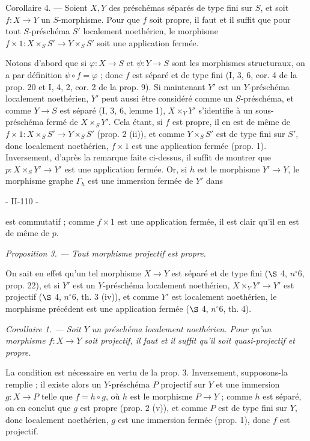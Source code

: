 Corollaire 4. — Soient $X, Y$ des préschémas séparés de type fini sur $S$, et soit $f: X \to Y$ un $S$-morphisme. Pour que $f$ soit propre, il faut et il suffit que pour tout $S$-préschéma $S'$ localement noethérien, le morphisme $f \times 1 : X \times_S S' \to Y \times_S S'$ soit une application fermée.

Notons d'abord que si $\varphi: X \to S$ et $\psi: Y \to S$ sont les morphismes structuraux, on a par définition $\psi \circ f = \varphi$ ; donc $f$ est séparé et de type fini (I, 3, 6, cor. 4 de la prop. 20 et I, 4, 2, cor. 2 de la prop. 9). Si maintenant $Y'$ est un $Y$-préschéma localement noethérien, $Y'$ peut aussi être considéré comme un $S$-préschéma, et comme $Y \to S$ est séparé (I, 3, 6, lemme 1), $X \times_Y Y'$ s'identifie à un sous-préschéma fermé de $X \times_S Y'$. Cela étant, si $f$ est propre, il en est de même de $f \times 1 : X \times_S S' \to Y \times_S S'$ (prop. 2 (ii)), et comme $Y \times_S S'$ est de type fini sur $S'$, donc localement noethérien, $f \times 1$ est une application fermée (prop. 1). Inversement, d'après la remarque faite ci-dessus, il suffit de montrer que $p: X \times_S Y' \to Y'$ est une application fermée. Or, si $h$ est le morphisme $Y' \to Y$, le morphisme graphe $\Gamma_h$ est une immersion fermée de $Y'$ dans

\newpage


- II-110 -

est commutatif ; comme $f \times 1$ est une application fermée, il est clair qu'il en est de même de $p$.

\emph{Proposition 3. — Tout morphisme projectif est propre.}

On sait en effet qu'un tel morphisme $X \to Y$ est séparé et de type fini ($\S$ 4, $n^{\circ}6$, prop. 22), et si $Y'$ est un $Y$-préschéma localement noethérien, $X \times_Y Y' \to Y'$ est projectif ($\S$ 4, $n^{\circ}6$, th. 3 (iv)), et comme $Y'$ est localement noethérien, le morphisme précédent est une application fermée ($\S$ 4, $n^{\circ}6$, th. 4).

\emph{Corollaire 1. — Soit $Y$ un préschéma localement noethérien. Pour qu'un morphisme $f : X \to Y$ soit projectif, il faut et il suffit qu'il soit quasi-projectif et propre.}

La condition est nécessaire en vertu de la prop. 3. Inversement, supposons-la remplie ; il existe alors un $Y$-préschéma $P$ projectif sur $Y$ et une immersion $g : X \to P$ telle que $f = h \circ g$, où $h$ est le morphisme $P \to Y$ ; comme $h$ est séparé, on en conclut que $g$ est propre (prop. 2 (v)), et comme $P$ est de type fini sur $Y$, donc localement noethérien, $g$ est une immersion fermée (prop. 1), donc $f$ est projectif.

